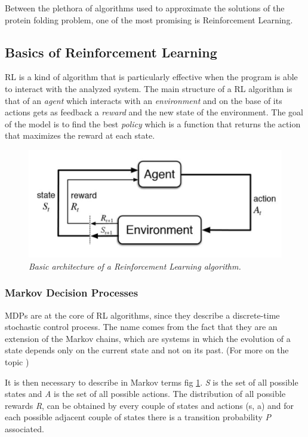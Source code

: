 Between the plethora of algorithms used to approximate the solutions of the protein folding problem, one of the most promising is Reinforcement Learning.

\subsection{Basics of Reinforcement Learning} \label{BRL}

RL is a kind of algorithm that is particularly effective when the program is able to interact with the analyzed system.
The main structure of a RL algorithm is that of an \emph{agent} which interacts with an \emph{environment} and on the base of its actions gets as feedback a \emph{reward} and the new state of the environment.
The goal of the model is to find the best \emph{policy} which is a function that returns the action that maximizes the reward at each state.


\begin{figure}[H]
    \centering
    \includegraphics[width=.75\textwidth]{img/rl0.png}
    \caption{\emph{Basic architecture of a Reinforcement Learning algorithm.}}
    \label{fig:rl0}
\end{figure}

\subsubsection{Markov Decision Processes}

MDPs are at the core of RL algorithms, since they describe a discrete-time stochastic control process.
The name comes from the fact that they are an extension of the Markov chains, which are systems in which the evolution of a state depends only on the current state and not on its past. (For more on the topic \cite{bellman1957markovian})


It is then necessary to describe in Markov terms fig \ref{fig:rl0}.
\emph{S} is the set of all possible states and \emph{A} is the set of all possible actions.
The distribution of all possible rewards \emph{R}, can be obtained by every couple of states and actions (s, a) and for each possible adjacent couple of states there is a transition probability \emph{P} associated.

